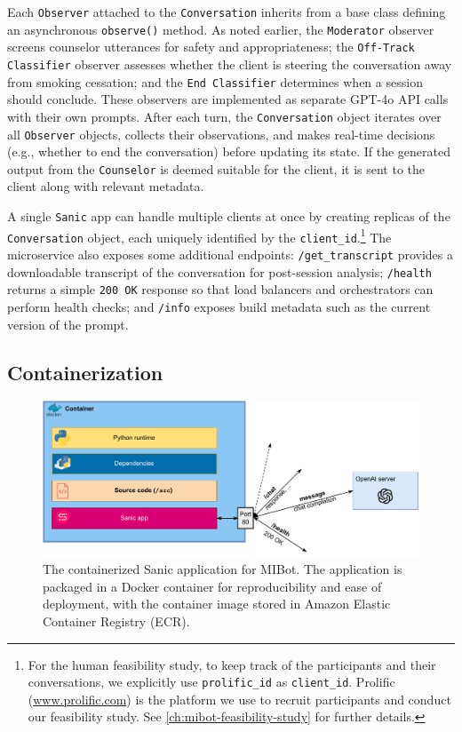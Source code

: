 Each \texttt{Observer} attached to the \texttt{Conversation} inherits from a base class defining an asynchronous \texttt{observe()} method. As noted earlier, the \texttt{Moderator} observer screens counselor utterances for safety and appropriateness; the \texttt{Off-Track Classifier} observer assesses whether the client is steering the conversation away from smoking cessation; and the \texttt{End Classifier} determines when a session should conclude. These observers are implemented as separate GPT-4o API calls with their own prompts. After each turn, the \texttt{Conversation} object iterates over all \texttt{Observer} objects, collects their observations, and makes real-time decisions (e.g., whether to end the conversation) before updating its state. If the generated output from the \texttt{Counselor} is deemed suitable for the client, it is sent to the client along with relevant metadata.

A single \texttt{Sanic} app can handle multiple clients at once by creating replicas of the \texttt{Conversation} object, each uniquely identified by the \texttt{client\_id}.\footnote{For the human feasibility study, to keep track of the participants and their conversations, we explicitly use \texttt{prolific\_id} as \texttt{client\_id}. Prolific (\url{www.prolific.com}) is the platform we use to recruit participants and conduct our feasibility study. See \cref{ch:mibot-feasibility-study} for further details.} The microservice also exposes some additional endpoints: \texttt{/get\_transcript} provides a downloadable transcript of the conversation for post-session analysis; \texttt{/health} returns a simple \texttt{200 OK} response so that load balancers and orchestrators can perform health checks; and \texttt{/info} exposes build metadata such as the current version of the prompt.

\subsection{Containerization}

\begin{figure}[ht]
  \centering
  \includegraphics[width=0.7\linewidth]{fig/container.drawio.pdf} 
  \caption[Containerized MIBot Application]{The containerized Sanic application for MIBot. The application is packaged in a Docker container for reproducibility and ease of deployment, with the container image stored in Amazon Elastic Container Registry (ECR).}
  \label{fig:containerization}
\end{figure}

